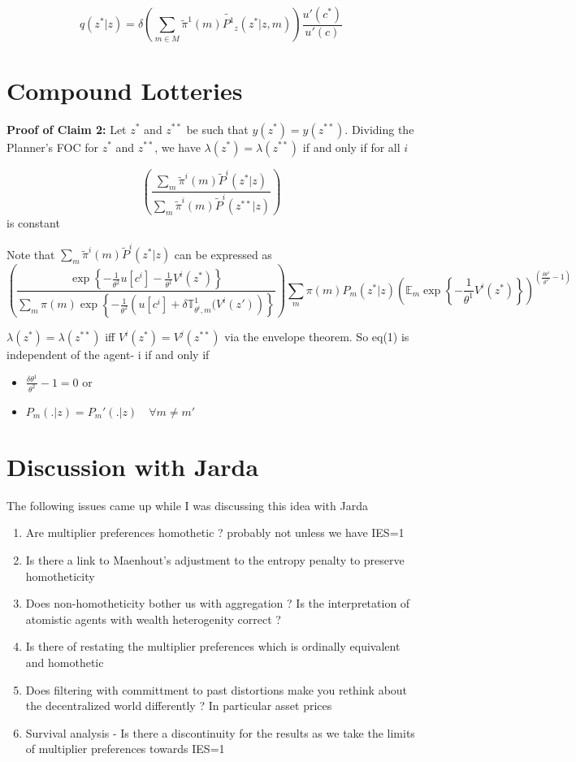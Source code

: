 \documentclass[12pt]{article}
\begin{document}
\[q(z^* |z )=\delta \left(\sum_{m \in M}\tilde{\pi}^1(m)\tilde{P^1}_z(z^* |z,m)\right)\frac{ u'(c^*)}{u'(c)}\]

\section{Compound Lotteries}

\textbf{Proof of Claim 2:}
Let $z^*$ and $z^{**}$ be such that $y(z^*)=y(z^{**})$. Dividing the Planner's FOC for $z^*$ and $z^{**}$, we have $\lambda(z^*)=\lambda(z^{**})$ if and only if for all $i$

\[\left(\frac{\sum_{m}\tilde \pi^i(m)\tilde P^i(z^*|z)}{\sum_{m}\tilde \pi^i(m)\tilde P^i(z^{**}|z)}\right)\] is constant

\noindent Note that $\sum_{m}\tilde \pi^i(m)\tilde P^i(z^*|z)$ can be expressed as 
\[\left(\frac{\exp\left\{-\frac{1}{\theta^2} u[c^i]-\frac{1}{\theta^1} V^i(z^*)\right \}}{\sum_{m}\pi(m)\exp\left\{-\frac{1}{\theta^2}\left(u[c^i]+\delta \mathbb{T}^{1}_{\theta^i,m}(V^i(z')\right)\right\}}\right)\sum_{m}\pi(m)P_m(z^*|z)\left(\mathbb{E}_{m} \exp\left\{-\frac{1}{\theta^1} V^i(z^*)\right\}\right)^{\left(\frac{\delta\theta^1}{\theta^2}-1\right)}\]

\noindent $\lambda(z^*)=\lambda(z^{**})$ iff $V^i(z^*)=V^j(z^{**})$ via the envelope theorem. So eq(1) is independent of the agent- i if and only if 
\begin{itemize}
	\item $\frac{\delta\theta^1}{\theta^2}-1=0$ or 
	\item $P_m(.|z)=P_m'(.|z)\quad \forall m\neq m'$
\end{itemize}


\section{Discussion with Jarda}
The following issues came up while I was discussing this idea with Jarda

\begin{enumerate}
	\item Are multiplier preferences homothetic ? probably not unless we have IES=1
	\item Is there a link to Maenhout's adjustment to the entropy penalty to preserve homotheticity
	\item Does non-homotheticity bother us with aggregation ? Is the interpretation of atomistic agents with wealth heterogenity correct ?
	\item Is there of restating the multiplier preferences which is ordinally equivalent and homothetic
	\item Does filtering with committment to past distortions make you rethink about the decentralized world differently ? In particular asset prices
	\item Survival analysis - Is there a discontinuity for the results as we take the limits of multiplier preferences towards IES=1
\end{enumerate}
\end{document}
